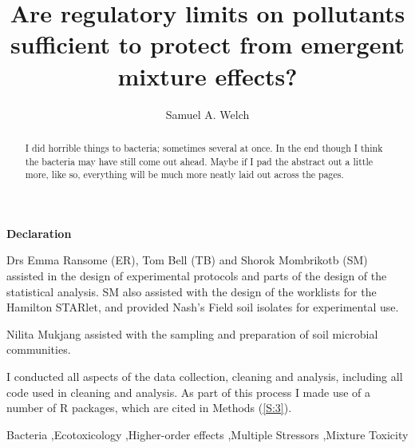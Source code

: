 \documentclass[final,1p,times]{elsarticle}
\begin{document}
\begin{frontmatter}


\noindent \textbf{Declaration} 

Drs Emma Ransome (ER), Tom Bell (TB) and Shorok Mombrikotb (SM) assisted in the design of experimental protocols and parts of the design of the statistical analysis. SM also assisted with the design of the worklists for the Hamilton STARlet, and provided Nash's Field soil isolates for experimental use.

Nilita Mukjang assisted with the sampling and preparation of soil microbial communities.

I conducted all aspects of the data collection, cleaning and analysis, including all code used in cleaning and analysis. As part of this process I made use of a number of R packages, which are cited in Methods (\cref{S:3}).
\newpage

\title{Are regulatory limits on pollutants sufficient to protect from emergent mixture effects?}


\author{Samuel A. Welch}

\address{Silwood Park, Imperial College London, United Kingdom}

\begin{abstract}
I did horrible things to bacteria; sometimes several at once. In the end though I think the bacteria may have still come out ahead. Maybe if I pad the abstract out a little more, like so, everything will be much more neatly laid out across the pages. 
\end{abstract}

\begin{keyword}
Bacteria \sep Ecotoxicology \sep Higher-order effects \sep Multiple Stressors \sep Mixture Toxicity


\end{keyword}

\end{frontmatter}
\end{document}
